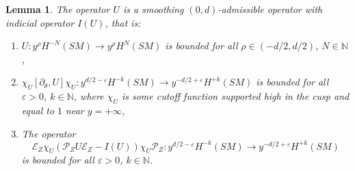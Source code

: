 \documentclass[JEP,XML,SOM,Unicode,NoFloatCountersInSection]{cedram}
\newcommand{\N}{\mathbb{N}}
\newcommand{\eps}{\varepsilon}
\newcommand{\mc}{\mathcal}
\theoremstyle{plain}
\newtheorem{lemma}{Lemma}[section]
\theoremstyle{definition}
\begin{document}
\begin{lemma}
\label{lemma:remainder}
The operator $U$ is a smoothing $(0,d)$-admissible operator with indicial operator $I(U)$, that is:
\begin{enumerate}
\item\label{lemma:remainder1} $U : y^\rho H^{-N}(SM) \to y^\rho H^{N}(SM)$ is bounded for all $\rho\in (-d/2, d/2)$, $N \in \N$,
\item\label{lemma:remainder2} $\chi_U[\partial_\theta, U]\chi_U : y^{d/2-\eps}H^{-k}(SM) \to y^{-d/2+\eps} H^{+k}(SM)$ is bounded for all $\eps>0$, $k \in \N$, where $\chi_U$ is some cutoff function supported high in the cusp and equal to $1$ near $y=+\infty$,
\item\label{lemma:remainder3}
The operator
\[
\mc{E}_Z \chi_U\left(\mathcal{P}_Z U \mathcal{E}_Z - I(U)\right)\chi_U \mc{P}_Z : y^{d/2-\eps}H^{-k}(SM) \to y^{-d/2+\eps} H^{+k}(SM)
\]
is bounded for all $\eps>0$, $k\in \N$.
\end{enumerate}
\end{lemma}

\end{document}

